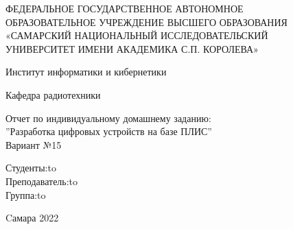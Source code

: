 \begin{titlepage}
\newpage
\doublespacing
\begin{center}
ФЕДЕРАЛЬНОЕ ГОСУДАРСТВЕННОЕ АВТОНОМНОЕ\\
ОБРАЗОВАТЕЛЬНОЕ УЧРЕЖДЕНИЕ ВЫСШЕГО ОБРАЗОВАНИЯ\\
«САМАРСКИЙ НАЦИОНАЛЬНЫЙ ИССЛЕДОВАТЕЛЬСКИЙ\\
УНИВЕРСИТЕТ ИМЕНИ АКАДЕМИКА С.П. КОРОЛЕВА»	
 \\
\end{center}

\vspace{5em}

\begin{center}
 Институт информатики и кибернетики \\ 
\end{center}

\begin{center}
Кафедра радиотехники \\ 
\end{center}


\vspace{3em}

\begin{center}
{Отчет по индивидуальному домашнему заданию:\\''Разработка цифровых устройств на базе ПЛИС''\\Вариант №15}
\end{center}

\vspace{14em}



\newbox{\lbox}
\newlength{\maxl}
\setlength{\maxl}{\wd\lbox}
\hfill\parbox{10cm}{
\hspace*{6cm}\hspace*{-6cm}Студенты:\hfill\hbox to\\
\hspace*{4cm}\hspace*{-4cm}Преподаватель:\hfill\hbox to\\
\hspace*{4cm}\hspace*{-4cm}Группа:\hfill\hbox to\\
}


\vspace{\fill}

\begin{center}
Cамара 2022
\end{center}

\end{titlepage}